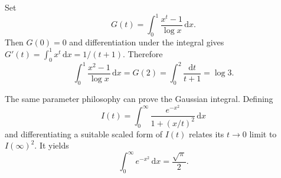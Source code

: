 \begin{example}
Set
\begin{equation}
G(t)=\int_0^1\frac{x^t-1}{\log x}\,\mathrm{d}x.
\end{equation}
Then $G(0)=0$ and differentiation under the integral gives $G'(t)=\int_0^1x^t\,\mathrm{d}x=1/(t+1)$. Therefore
\begin{equation}
\int_0^1\frac{x^2-1}{\log x}\,\mathrm{d}x=G(2)=\int_0^2\frac{\mathrm{d}t}{t+1}=\log3.
\end{equation}
\end{example}

The same parameter philosophy can prove the Gaussian integral. Defining
\begin{equation}
I(t)=\int_0^\infty\frac{e^{-x^2}}{1+(x/t)^2}\,\mathrm{d}x
\end{equation}
and differentiating a suitable scaled form of $I(t)$ relates its $t\to0$ limit to $I(\infty)^2$. It yields
\begin{equation}
\int_0^\infty e^{-x^2}\,\mathrm{d}x=\frac{\sqrt{\pi}}{2}.
\end{equation}
